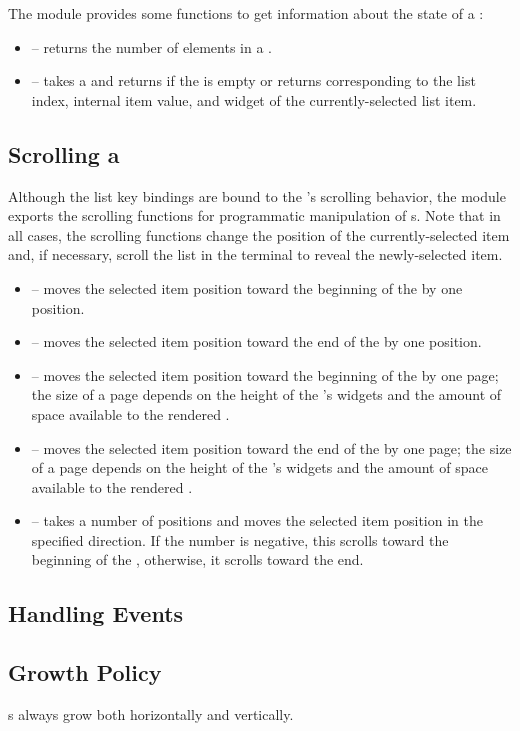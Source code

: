 The  module provides some functions to get information about
the state of a :

\begin{itemize}
\item {} -- returns the number of elements in a
  .
\item {} -- takes a  and returns
   if the  is empty or returns  corresponding to the list index, internal item
  value, and widget of the currently-selected list item.
\end{itemize}

\subsection{Scrolling a }

Although the list key bindings are bound to the 's scrolling
behavior, the  module exports the scrolling functions for
programmatic manipulation of s.  Note that in all cases, the
scrolling functions change the position of the currently-selected item
and, if necessary, scroll the list in the terminal to reveal the
newly-selected item.

\begin{itemize}
\item {} -- moves the selected item position toward the
  beginning of the  by one position.
\item {} -- moves the selected item position toward the
  end of the  by one position.
\item {} -- moves the selected item position toward the
  beginning of the  by one page; the size of a page depends
  on the height of the 's widgets and the amount of space
  available to the rendered .
\item {} -- moves the selected item position toward the end
  of the  by one page; the size of a page depends on the
  height of the 's widgets and the amount of space available
  to the rendered .
\item {} -- takes a number of positions and moves the
  selected item position in the specified direction.  If the number is
  negative, this scrolls toward the beginning of the ,
  otherwise, it scrolls toward the end.
\end{itemize}

\subsection{Handling Events}

\subsection{Growth Policy}

s always grow both horizontally and vertically.

